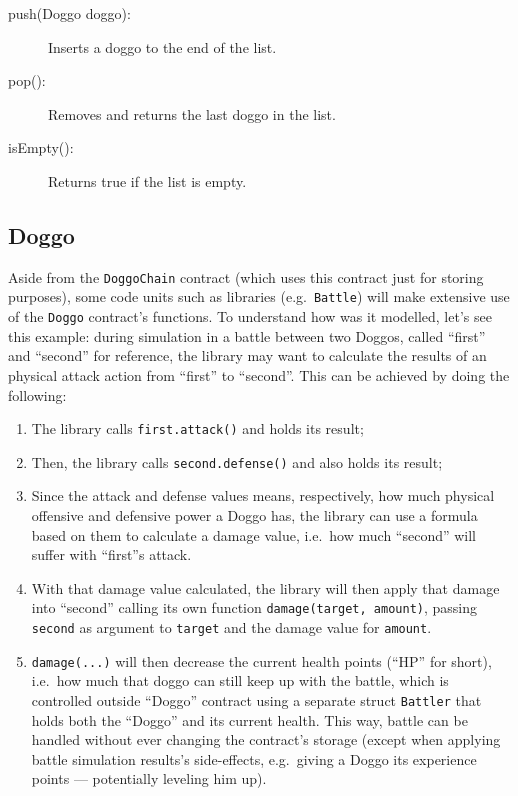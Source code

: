 \documentclass{article}
\begin{document}
    \begin{description}
        \item[push(Doggo doggo):] Inserts a doggo to the end of the list.
        \item[pop():] Removes and returns the last doggo in the list.
        \item[isEmpty():] Returns true if the list is empty.
    \end{description}

    \subsection{Doggo}

    Aside from the \texttt{DoggoChain} contract (which uses this contract just
    for storing purposes), some code units such as libraries (e.g.\
    \texttt{Battle}) will make extensive use of the \texttt{Doggo} contract's
    functions. To understand how was it modelled, let's see this example:
    during simulation in a battle between two Doggos, called ``first'' and
    ``second'' for reference, the library may want to calculate the results of
    an physical attack action from ``first'' to ``second''. This can be
    achieved by doing the following:

    \begin{enumerate}
        \item The library calls \texttt{first.attack()} and holds its result;
        \item Then, the library calls \texttt{second.defense()} and also holds
            its result;
        \item Since the attack and defense values means, respectively, how much
            physical offensive and defensive power a Doggo has, the library can
            use a formula based on them to calculate a damage value, i.e.\ how
            much ``second'' will suffer with ``first''s attack.
        \item With that damage value calculated, the library will then apply
            that damage into ``second'' calling its own function
            \texttt{damage(target, amount)}, passing \texttt{second} as
            argument to \texttt{target} and the damage value for
            \texttt{amount}.
        \item \texttt{damage(...)} will then decrease the current health points
            (``HP'' for short), i.e.\ how much that doggo can still keep up
            with the battle, which is controlled outside ``Doggo'' contract
            using a separate struct \texttt{Battler} that holds both the
            ``Doggo'' and its current health. This way, battle can be handled
            without ever changing the contract's storage (except when applying
            battle simulation results's side-effects, e.g.\ giving a Doggo its
            experience points --- potentially leveling him up).
    \end{enumerate}
\end{document}
